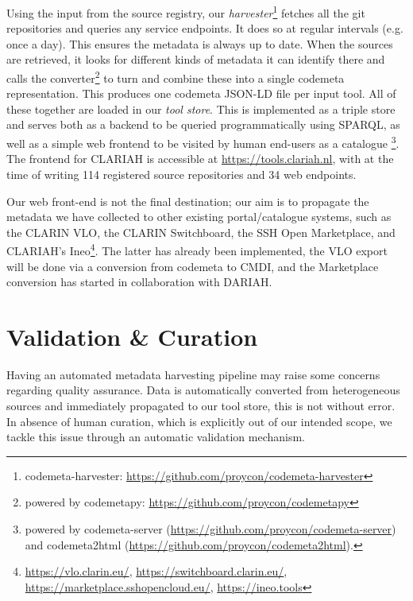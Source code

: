 \documentclass[a4paper,11pt]{article}
\begin{document}
Using the input from the source registry, our
\emph{harvester}\footnote{codemeta-harvester:
\url{https://github.com/proycon/codemeta-harvester}} fetches all the git
repositories and queries any service endpoints. It does so at regular intervals
(e.g. once a day). This ensures the metadata is always up to date. When the
sources are retrieved, it looks for different kinds of metadata it can identify
there and calls the converter\footnote{powered by codemetapy:
\url{https://github.com/proycon/codemetapy}} to turn and combine these into a
single codemeta representation. This produces one codemeta JSON-LD file per
input tool. All of these together are loaded in our \emph{tool store}. This is
implemented as a triple store and serves both as a backend to be queried
programmatically using SPARQL, as well as a simple web frontend to be visited
by human end-users as a catalogue \footnote{powered by codemeta-server
(\url{https://github.com/proycon/codemeta-server}) and codemeta2html
(\url{https://github.com/proycon/codemeta2html}).}. The frontend for CLARIAH is
accessible at \url{https://tools.clariah.nl}, with at the time of writing
114 registered source repositories and 34 web endpoints.

Our web front-end is not the final destination; our aim is to propagate the
metadata we have collected to other existing portal/catalogue systems, such as
the CLARIN VLO, the CLARIN Switchboard, the SSH Open Marketplace, and CLARIAH's
Ineo\footnote{\url{https://vlo.clarin.eu/},
\url{https://switchboard.clarin.eu/},
\url{https://marketplace.sshopencloud.eu/}, \url{https://ineo.tools}}. The
latter has already been implemented, the VLO export will be done via a conversion
from codemeta to CMDI, and the Marketplace conversion has started in collaboration with
DARIAH.

\section{Validation \& Curation}

Having an automated metadata harvesting pipeline may raise some concerns
regarding quality assurance. Data is automatically converted from heterogeneous
sources and immediately propagated to our tool store, this is not without
error. In absence of human curation, which is explicitly out of our intended
scope, we tackle this issue through an automatic validation mechanism.
\end{document}
